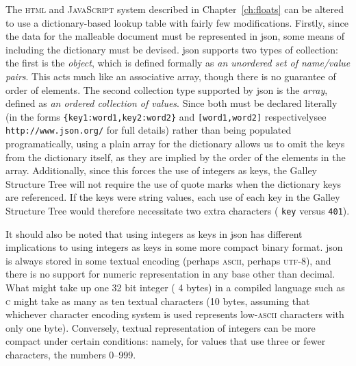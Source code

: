 The \textsc{html} and \textsc{JavaScript} system described in Chapter~\ref{ch:floats} can be altered to use a dictionary-based lookup table with fairly few modifications. Firstly, since the data for the malleable document must be represented in \gls{json}, some means of including the dictionary must be devised. \gls{json} supports two types of collection: the first is the \emph{object}, which is defined formally as \emph{an \mbox{unordered} set of name/value pairs}. This acts much like an associative array, though there is no guarantee of order of elements.  The second collection type supported by \gls{json} is the \emph{array}, defined as \emph{an ordered collection of values}. Since both must be declared literally (in the forms \texttt{\{\textquotedbl key1\textquotedbl:\textquotedbl word1\textquotedbl,\textquotedbl key2\textquotedbl:\textquotedbl word2\textquotedbl\}} and \texttt{[\textquotedbl word1\textquotedbl,\textquotedbl word2\textquotedbl]} respectively\ed see \texttt{http://www.json.org/} for full details) rather than being populated programatically, using a plain array for the dictionary allows us to omit the keys from the dictionary itself, as they are implied by the order of the elements in the array. Additionally, since this forces the use of integers as keys, the Galley Structure Tree will not require the use of quote marks when the dictionary keys are referenced. If the keys were string values, each use of each key in the Galley Structure Tree would therefore necessitate two extra characters (\eg{} \texttt{\textquotedbl key\textquotedbl} versus \texttt{401}).

It should also be noted that using integers as keys in \gls{json} has different implications to using integers as keys in some more compact binary format. \gls{json} is always stored in some textual encoding (perhaps \textsc{ascii}, perhaps \textsc{utf-8}), and there is no support for numeric representation in any base other than decimal. What might take up one 32 bit integer (\ie{} 4 bytes) in a compiled language such as \textsc{c} might take as many as ten textual characters (10 bytes, assuming that whichever character encoding system is used represents low-\textsc{ascii} characters with only one byte). Conversely, textual representation of integers can be more compact under certain conditions: namely, for values that use three or fewer characters, \ie{} the numbers 0--999.


